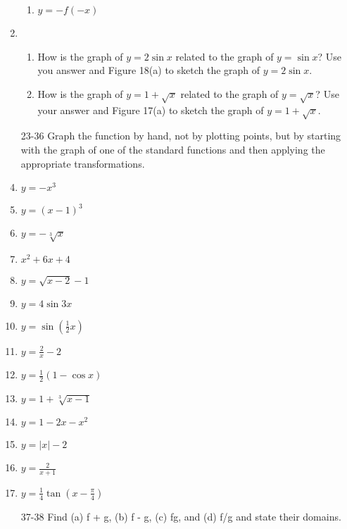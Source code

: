 \documentclass{article}
\begin{document}
\begin{enumerate}
\begin{enumerate}
			\item $y = -f(-x)$
		\end{enumerate}
			
		\item 
		\begin{enumerate}
		
			\item How is the graph of $y = 2 \sin x$ related to the graph of $y = \sin x$?
				Use you answer and Figure 18(a) to sketch the graph of $y =2 \sin x$.
				
			\item How is the graph of $y = 1 + \sqrt{x}$ related to the graph of $y = \sqrt{x}$?
				Use your answer and Figure 17(a) to sketch the graph of $y = 1 + \sqrt{x}$.
		\end{enumerate}
		
		\item[23-36] Graph the function by hand, not by plotting points, but by starting with the graph
				of one of the standard functions and then applying the appropriate transformations.
				
		\item $y = -x^3$
		
		\item $y = (x - 1)^3$
		
		\item $y = -\sqrt[3]{x}$
		
		\item $x^2 + 6x + 4$
		
		\item $y = \sqrt{x - 2} - 1$
		
		\item $y = 4 \sin 3x $
		
		\item $y = \sin(\frac{1}{2}x)$
		
		\item $y = \frac{2}{x} - 2$
		
		\item $y = \frac{1}{2}(1 - \cos x)$
		
		\item $y = 1 + \sqrt[3]{x - 1}$
		
		\item $y = 1 - 2x - x^2$
		
		\item $y = |x| - 2$
		
		\item $y = \frac{2}{x + 1}$
		
		\item $y = \frac{1}{4} \tan(x - \frac{\pi}{4})$
		\item[37-38] Find (a) f + g, (b) f - g, (c) fg, and (d) f/g and state their domains.


\end{enumerate}
\end{document}
